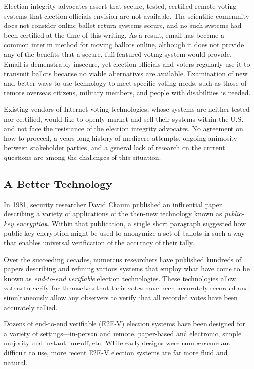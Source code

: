 Election integrity advocates assert that secure, tested, certified
remote voting systems that election officials envision are not
available. The scientific community does not consider online ballot
return systems secure, and no such systems had been certified at the
time of this writing. As a result, email has become a common interim
method for moving ballots online, although it does not provide any of
the benefits that a secure, full-featured voting system would provide.
Email is demonstrably insecure, yet election officials and voters
regularly use it to transmit ballots because no viable alternatives are
available. Examination of new and better ways to use technology to
meet specific voting needs, such as those of remote overseas citizens,
military members, and people with disabilities is needed.

Existing vendors of Internet voting technologies, whose systems are
neither tested nor certified, would like to openly market and sell
their systems within the U.S. and not face the resistance of the
election integrity advocates. No agreement on how to proceed, a
years-long history of mediocre attempts, ongoing animosity between
stakeholder parties, and a general lack of research on the current
questions are among the challenges of this situation.

\subsection{A Better Technology}
\label{sec:better-technology}

In 1981, security researcher David Chaum published an influential
paper describing a variety of applications of the then-new technology
known as \emph{public-key encryption}. Within that publication, a single
short paragraph suggested how public-key encryption might be used to
anonymize a set of ballots in such a way that enables universal
verification of the accuracy of their tally.

Over the succeeding decades, numerous researchers have published
hundreds of papers describing and refining various systems that employ
what have come to be known as \emph{end-to-end verifiable} election
technologies. These technologies allow voters to verify for themselves
that their votes have been accurately recorded and simultaneously
allow any observers to verify that all recorded votes have been
accurately tallied.

Dozens of end-to-end verifiable (E2E-V) election systems have been
designed for a variety of settings---in-person and remote, paper-based
and electronic, simple majority and instant run-off, etc. While early
designs were cumbersome and difficult to use, more recent E2E-V
election systems are far more fluid and natural.

